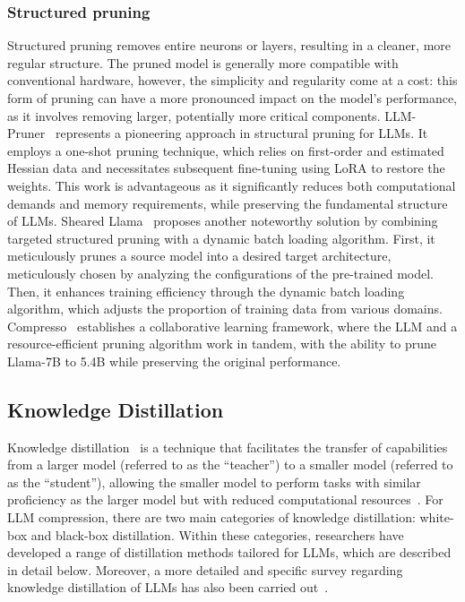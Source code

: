 \subsubsection{Structured pruning} 
Structured pruning removes entire neurons or layers, resulting in a cleaner, more regular structure. The pruned model is generally more compatible with conventional hardware, however, the simplicity and regularity come at a cost: this form of pruning can have a more pronounced impact on the model's performance, as it involves removing larger, potentially more critical components.
LLM-Pruner~\citep{ma2023llm} represents a pioneering approach in structural pruning for LLMs. It employs a one-shot pruning technique, which relies on first-order and estimated Hessian data and necessitates subsequent fine-tuning using LoRA to restore the weights. This work is advantageous as it significantly reduces both computational demands and memory requirements, while preserving the fundamental structure of LLMs. 
Sheared Llama~\citep{xia2023sheared} proposes another noteworthy solution by combining targeted structured pruning with a dynamic batch loading algorithm. First, it meticulously prunes a source model into a desired target architecture, meticulously chosen by analyzing the configurations of the pre-trained model. Then, it enhances training efficiency through the dynamic batch loading algorithm, which adjusts the proportion of training data from various domains.
Compresso~\citep{guo2023compresso} establishes a collaborative learning framework, where the LLM and a resource-efficient pruning algorithm work in tandem, with the ability to prune Llama-7B to 5.4B while preserving the original performance.


\subsection{Knowledge Distillation}
Knowledge distillation~\citep{hinton2015distilling,gou2021knowledge} is a technique that facilitates the transfer of capabilities from a larger model (referred to as the ``teacher'') to a smaller model (referred to as the ``student''), allowing the smaller model to perform tasks with similar proficiency as the larger model but with reduced computational resources~\citep{gou2021knowledge,shang2021lipschitz}. 
For LLM compression, there are two main categories of knowledge distillation: white-box and black-box distillation. Within these categories, researchers have developed a range of distillation methods tailored for LLMs, which are described in detail below. 
Moreover, a more detailed and specific survey regarding knowledge distillation of LLMs has also been carried out~\citep{xu2024kdsurvey}. 

